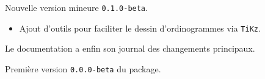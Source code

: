 \documentclass[12pt,a4paper]{article}
\begin{document}
\begin{description}[leftmargin=1em]

    \item[2019-10-19] Nouvelle version mineure \verb+0.1.0-beta+.
    \begin{itemize}
        \item Ajout d'outils pour faciliter le dessin d'ordinogrammes via \verb+TiKz+.
    \end{itemize}



    \item[2019-10-18] Le documentation a enfin son journal des changements principaux.



    \item[2019-09-03] Première version \verb+0.0.0-beta+ du package.
\end{description}
\end{document}

